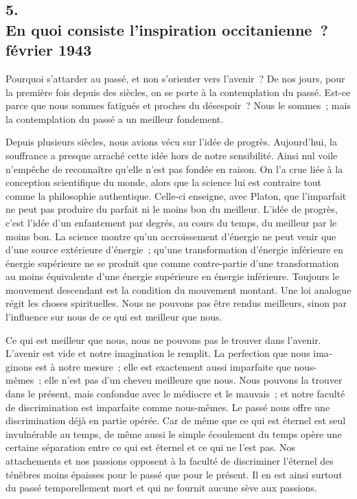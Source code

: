 \documentclass[french,twoside]{book} %
\begin{document}
\begin{center}
\noindent \centerline{}
\end{center}

\subsection[{5. En quoi consiste l’inspiration occitanienne ? février 1943}]{5. \\
En quoi consiste l’inspiration occitanienne ? \\
février 1943}
\noindent \par
Pourquoi s'attarder au passé, et non s'orienter vers l'avenir ? De nos jours, pour la première fois depuis des siècles, on se porte à la contemplation du passé. Est-ce parce que nous sommes fatigués et proches du désespoir ? Nous le sommes ; mais la contemplation du passé a un meilleur fondement.\par
Depuis plusieurs siècles, nous avions vécu sur l'idée de progrès. Aujour­d'hui, la souffrance a presque arraché cette idée hors de notre sensibilité. Ainsi nul voile n'empêche de reconnaître qu'elle n'est pas fondée en raison. On l'a crue liée à la conception scientifique du monde, alors que la science lui est contraire tout comme la philosophie authentique. Celle-ci enseigne, avec Platon, que l'imparfait ne peut pas produire du parfait ni le moins bon du meilleur. L'idée de progrès, c'est l'idée d'un enfantement par degrés, au cours du temps, du meilleur par le moins bon. La science montre qu'un accroisse­ment d'énergie ne peut venir que d'une source extérieure d'énergie ; qu'une transformation d'énergie inférieure en énergie supérieure ne se produit que comme contre-partie d'une transformation au moins équivalente d'une énergie supérieure en énergie inférieure. Toujours le mouvement descendant est la condition du mouvement montant. Une loi analogue régit les choses spiri­tuelles. Nous ne pouvons pas être rendus meilleurs, sinon par l'influence sur nous de ce qui est meilleur que nous.\par
Ce qui est meilleur que nous, nous ne pouvons pas le trouver dans l'avenir. L'avenir est vide et notre imagination le remplit. La perfection que nous ima­ginons est à notre mesure ; elle est exactement aussi imparfaite que nous-mêmes ; elle n'est pas d'un cheveu meilleure que nous. Nous pouvons la trouver dans le présent, mais confondue avec le médiocre et le mauvais ; et notre faculté de discrimination est imparfaite comme nous-mêmes. Le passé nous offre une discrimination déjà en partie opérée. Car de même que ce qui est éternel est seul invulnérable au temps, de même aussi le simple écoule­ment du temps opère une certaine séparation entre ce qui est éternel et ce qui ne l'est pas. Nos attachements et nos passions opposent à la faculté de discri­miner l'éternel des ténèbres moins épaisses pour le passé que pour le présent. Il en est ainsi surtout du passé temporellement mort et qui ne fournit aucune sève aux passions.\par
\end{document}
